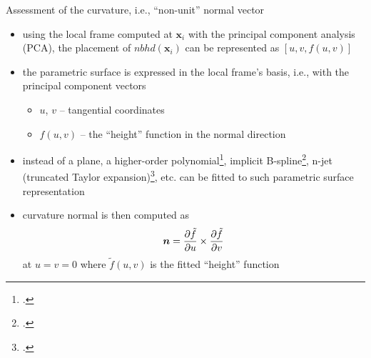 \documentclass[xcolor=dvipsnames,10pt]{beamer}
\begin{document}
\begin{frame}{Assessment of the curvature, i.e., ``non-unit'' normal vector}
\begin{itemize}
    \item using the local frame computed at $\boldsymbol{x}_i$ with the principal component analysis (PCA), the placement of $nbhd (\boldsymbol{x}_i)$ can be represented as $[ u, v, f(u, v) ]$
    \item the parametric surface is expressed in the local frame's basis, i.e., with the principal component vectors
    \begin{itemize}
        \item $u$, $v$ -- tangential coordinates
        \item $f(u, v)$ -- the ``height'' function in the normal direction
    \end{itemize}
    \item instead of a plane, a higher-order polynomial\footcite{Levin1998}, implicit B-spline\footcite{Rouhani2015}, n-jet (truncated Taylor expansion)\footcite{Cazals2005}, etc. can be fitted to such parametric surface representation
    \item curvature normal is then computed as
    \begin{equation*}
        \centering
        \boldsymbol{n} = \frac{\partial \tilde f}{\partial u} \times \frac{\partial \tilde f}{\partial v}
    \end{equation*}
    at $u = v = 0$ where $\tilde{f}(u, v)$ is the fitted ``height'' function
\end{itemize}
\end{frame}
\end{document}
